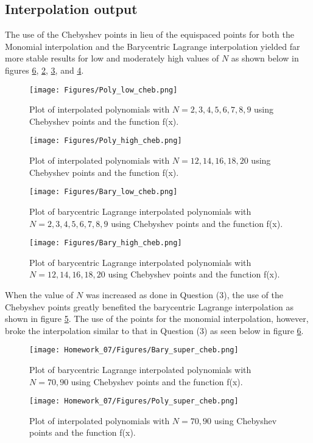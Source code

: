 \documentclass{article}
\begin{document}
\subsection{Interpolation output}
The use of the Chebyshev points in lieu of the equispaced points for both the Monomial interpolation and the Barycentric Lagrange interpolation yielded far more stable results for low and moderately high values of \(N\) as shown below in figures \ref{fig:Poly_Super_Cheb}, \ref{fig:Poly_High_Cheb}, \ref{fig:Bary_Low_Cheb}, and \ref{fig:Bary_High_Cheb}.
\begin{figure}[h!]
    \centering
    \texttt{[image: Figures/Poly\_low\_cheb.png]}
    \caption{Plot of interpolated polynomials with \(N=2,3,4,5,6,7,8,9\) using Chebyshev points and the function f(x).}
    \label{fig:Cheb_Low_Cheb}
\end{figure}
\begin{figure}[h!]
    \centering
    \texttt{[image: Figures/Poly\_high\_cheb.png]}
    \caption{Plot of interpolated polynomials with \(N=12,14,16,18,20\) using Chebyshev points and the function f(x).}
    \label{fig:Poly_High_Cheb}
\end{figure}
\newpage
\begin{figure}[h!]
    \centering
    \texttt{[image: Figures/Bary\_low\_cheb.png]}
    \caption{Plot of barycentric Lagrange interpolated polynomials with \(N=2,3,4,5,6,7,8,9\) using Chebyshev points and the function f(x).}
    \label{fig:Bary_Low_Cheb}
\end{figure}
\begin{figure}[h!]
    \centering
    \texttt{[image: Figures/Bary\_high\_cheb.png]}
    \caption{Plot of barycentric Lagrange interpolated polynomials with \(N=12,14,16,18,20\) using Chebyshev points and the function f(x).}
    \label{fig:Bary_High_Cheb}
\end{figure}
When the value of \(N\) was increased as done in Question (3), the use of the Chebyshev points greatly benefited the barycentric Lagrange interpolation as shown in figure \ref{fig:Bary_Super_Cheb}. The use of the points for the monomial interpolation, however, broke the interpolation similar to that in Question (3) as seen below in figure \ref{fig:Poly_Super_Cheb}.
\begin{figure}[h!]
    \centering
    \texttt{[image: Homework\_07/Figures/Bary\_super\_cheb.png]}
    \caption{Plot of barycentric Lagrange interpolated polynomials with \(N=70,90\) using Chebyshev points and the function f(x).}
    \label{fig:Bary_Super_Cheb}
\end{figure}
\begin{figure}[h!]
    \centering
    \texttt{[image: Homework\_07/Figures/Poly\_super\_cheb.png]}
    \caption{Plot of interpolated polynomials with \(N=70,90\) using Chebyshev points and the function f(x).}
    \label{fig:Poly_Super_Cheb}
\end{figure}

\end{document}

